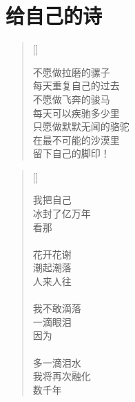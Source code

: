 \chapter{给自己的诗}
\thispagestyle{empty}
\renewcommand{\poemtoc}{section}
\settowidth{\versewidth}{不愿做拉磨的骡子}
\begin{verse}[\versewidth]

不愿做拉磨的骡子\\
每天重复自己的过去\\
不愿做飞奔的骏马\\
每天可以疾驰多少里\\
只愿做默默无闻的骆驼\\
在最不可能的沙漠里\\
留下自己的脚印！
\end{verse}


\renewcommand{\poemtoc}{section}
\settowidth{\versewidth}{我把自己}
\begin{verse}[\versewidth]

我把自己\\
冰封了亿万年\\
看那\\
~\\
花开花谢\\
潮起潮落\\
人来人往\\
~\\
我不敢滴落\\
一滴眼泪\\
因为\\
~\\
多一滴泪水\\
我将再次融化\\
数千年
\end{verse}
